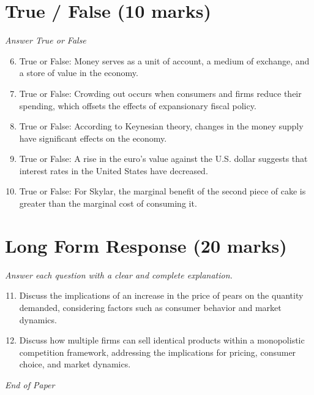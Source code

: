 \documentclass[12pt]{article}
\begin{document}
\section*{True / False (10 marks)}
\textit{Answer True or False}
\begin{enumerate}[label=\arabic*.]
\setcounter{enumi}{5}
\item True or False: Money serves as a unit of account, a medium of exchange, and a store of value in the economy.
\item True or False: Crowding out occurs when consumers and firms reduce their spending, which offsets the effects of expansionary fiscal policy.
\item True or False: According to Keynesian theory, changes in the money supply have significant effects on the economy.
\item True or False: A rise in the euro's value against the U.S. dollar suggests that interest rates in the United States have decreased.
\item True or False: For Skylar, the marginal benefit of the second piece of cake is greater than the marginal cost of consuming it.
\end{enumerate}

\section*{Long Form Response (20 marks)}
\textit{Answer each question with a clear and complete explanation.}
\begin{enumerate}[label=\arabic*.]
\setcounter{enumi}{10}
\item Discuss the implications of an increase in the price of pears on the quantity demanded, considering factors such as consumer behavior and market dynamics.
\item Discuss how multiple firms can sell identical products within a monopolistic competition framework, addressing the implications for pricing, consumer choice, and market dynamics.
\end{enumerate}

\vfill
\noindent\textit{End of Paper}
\end{document}
